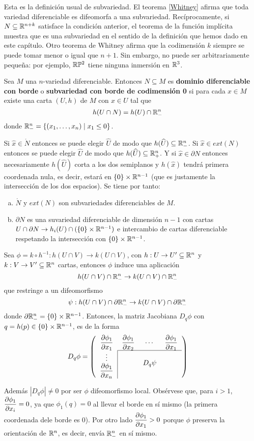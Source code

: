 \documentclass[CV.tex]{subfiles}
\begin{document}
Esta es la definición usual de subvariedad. El teorema \ref{Whitney} afirma que toda variedad diferenciable es difeomorfa a una subvariedad. Recíprocamente, si $N\subseteq\mathbb{R}^{n+k}$ satisface la condición anterior, el teorema de la función implícita muestra que es una subvariedad en el sentido de la definición que hemos dado en este capítulo. Otro teorema de Whitney afirma que la codimensión $k$ siempre se puede tomar menor o igual que $n+1$. Sin embargo, no puede ser arbitrariamente pequeña: por ejemplo, $\mathbb{R}\mathbb{P}^2$ tiene ninguna inmersión en $\mathbb{R}^3$. 

\begin{defi}
Sea $M$ una $n$-variedad diferenciable. Entonces $N\subseteq M$ es \textbf{dominio diferenciable con borde} o \textbf{subvariedad con borde de codimensión 0} si para cada $x\in M$ existe una carta $(U,h)$ de $M$ con $x\in U$ tal que 
\[
h(U\cap N)=h(U)\cap\mathbb{R}^n_-
\]
donde $\mathbb{R}^n_-=\{(x_1,\dots, x_n)\mid x_1\leq 0\}$. 
\end{defi}

Si $\hat{x}\in \mathring{N}$ entonces se puede elegir $\widehat{U}$ de modo que $h(\widehat{U})\subseteq\mathbb{R}^n_-$. Si $\hat{x}\in ext(N)$ entonces se puede elegir $\widehat{U}$ de modo que $h(\widehat{U})\subseteq\mathbb{R}^n_+$. Y si $\hat{x}\in\partial N$ entonces necesariamente $h(\widehat{U})$ corta a los dos semiplanos y $h(\hat{x})$ tendrá primera coordenada nula, es decir, estará en $\{0\}\times \mathbb{R}^{n-1}$ (que es justamente la intersección de los dos espacios). Se tiene por tanto:
\begin{enumerate}[a)]
\item $\mathring{N}$ y $ext(N)$ son subvariedades diferenciables de $M$.
\item $\partial N$ es una suvariedad diferenciable de dimensión $n-1$ con cartas $U\cap \partial N\to h_i(U)\cap (\{0\}\times\mathbb{R}^{n-1})$ e intercambio de cartas diferenciable respetando la intersección con $\{0\}\times\mathbb{R}^{n-1}$. 
\end{enumerate}
Sea $\phi=k\circ h^{-1}:h(U\cap V)\to k(U\cap V)$, con $h:U\to U'\subseteq\mathbb{R}^n$ y $k:V\to V'\subseteq\mathbb{R}^n$ cartas, entonces $\phi$ induce una aplicación 
\[
h(U\cap V)\cap\mathbb{R}^n_-\to k(U\cap V)\cap\mathbb{R}^n_-
\]
que restringe a un difeomorfismo
\[
\psi:h(U\cap V)\cap\partial\mathbb{R}^n_-\to k(U\cap V)\cap\partial\mathbb{R}^n_-
\]
donde $\partial\mathbb{R}^n_-=\{0\}\times\mathbb{R}^{n-1}$. Entonces, la matriz Jacobiana $D_q\phi$ con $q=h(p)\in\{0\}\times\mathbb{R}^{n-1}$, es de la forma
\[
D_q\phi=\left(
\begin{tabular}{cccc}
$\dparcial{\phi_1}{x_1}$ & $\dparcial{\phi_1}{x_2}$ & $\cdots$ & $\dparcial{\phi_1}{x_1}$\\\cline{2-4}
\multicolumn{1}{c|}{$\vdots$}  & &\multirow{2}{*}{$D_q\psi$} & \\
\multicolumn{1}{c|}{$\dparcial{\phi_1}{x_n}$} & & & 
\end{tabular}
 \right)
\]

Además $|D_q\phi|\neq 0$ por ser $\phi$ difeomorfismo local. Obsérvese que, para $i>1$, $\dfrac{\partial \phi_1}{\partial x_i}=0$, ya que $\phi_1(q)=0$ al llevar el borde en sí mismo (la primera coordenada dele borde es 0). Por otro lado  $\dfrac{\partial \phi_1}{\partial x_1}>0$ porque $\phi$ preserva la orientación de $\mathbb{R}^n$, es decir, envía $\mathbb{R}^n_-$ en sí mismo. 
\end{document}
